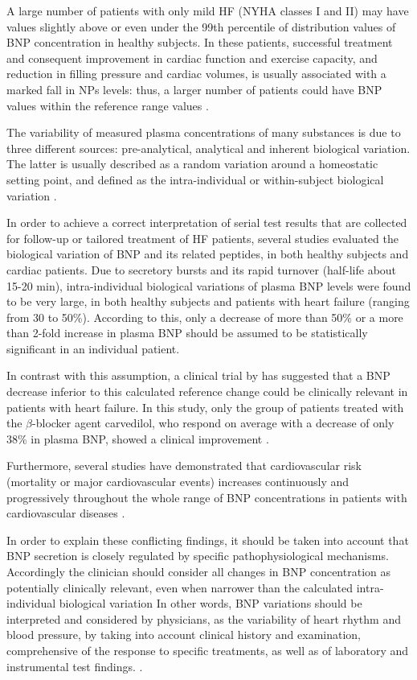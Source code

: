 \documentclass[14pt,a4paper,onecolumn]{extarticle}
\begin{document}
A large number of patients with only mild HF (NYHA classes I and II) may have values slightly above or even under the 99th percentile of distribution values of BNP concentration in healthy subjects. In these patients, successful treatment and consequent improvement in cardiac function and exercise capacity, and reduction in filling pressure and cardiac volumes, is usually associated with a marked fall in NPs levels: thus, a larger number of patients could have BNP values within the reference range values \citep{bib35}. %

The variability of measured plasma concentrations of many substances is due to three different sources: pre-analytical, analytical and inherent biological variation. The latter is usually described as a random variation around a homeostatic setting point, and defined as the intra-individual or within-subject biological variation \citep{bib395}.

In order to achieve a correct interpretation of serial test results that are collected for follow-up or tailored treatment of HF patients, several studies evaluated the biological variation of BNP and its related peptides, in both healthy subjects and cardiac patients. Due to secretory bursts and its rapid turnover (half-life about 15-20 min), intra-individual biological variations of plasma BNP levels were found to be very large, in both healthy subjects and patients with heart failure (ranging from 30 to 50\%). According to this, only a decrease of more than 50\% or a more than 2-fold increase in plasma BNP should be assumed to be statistically significant in an individual patient. \citep{bib399}

In contrast with this assumption, a clinical trial by \citep{bib390} has suggested that a BNP decrease inferior to this calculated reference change could be clinically relevant in patients with heart failure. In this study, only the group of patients treated with the $\beta$-blocker agent carvedilol, who respond on average with a decrease of only 38\% in plasma BNP, showed a clinical improvement \citep{bib390}.

Furthermore, several studies have demonstrated that cardiovascular risk (mortality or major cardiovascular events) increases continuously and progressively throughout the whole range of BNP concentrations in patients with cardiovascular diseases \citep{bib35}.

In order to explain these conflicting findings, it should be taken into account that BNP secretion is closely regulated by specific pathophysiological mechanisms.  Accordingly the clinician should consider all changes in BNP concentration as potentially clinically relevant, even when narrower than the calculated intra-individual biological variation In other words, BNP variations should be interpreted and considered by physicians, as the variability of heart rhythm and blood pressure, by taking into account clinical history and examination, comprehensive of the response to specific treatments, as well as of laboratory and instrumental test findings. \citep{bib3103}.


\end{document}

